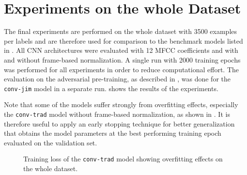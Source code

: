 
\section{Experiments on the whole Dataset}\label{sec:exp_final}
The final experiments are performed on the whole dataset with 3500 examples per labels and are therefore used for comparison to the benchmark models listed in .
All CNN architectures were evaluated with 12 MFCC coefficients and with and without frame-based normalization.
A single run with 2000 training epochs was performed for all experiments in order to reduce computational effort.
The evaluation on the adversarial pre-training, as described in , was done for the \texttt{conv-jim} model in a separate run.
 shows the results of the experiments.

Note that some of the models suffer strongly from overfitting effects, especially the \texttt{conv-trad} model without frame-based normalization, as shown in .
It is therefore useful to apply an early stopping technique for better generalization that obtains the model parameters at the best performing training epoch evaluated on the validation set.
\begin{figure}[!ht]
  \centering
  \quad
  \caption{Training loss of the \texttt{conv-trad} model showing overfitting effects on the whole dataset.}
  \label{fig:exp_final_loss_conv-trad}
\end{figure}
